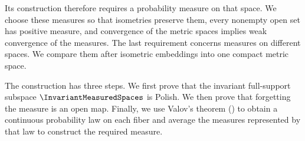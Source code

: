 Its construction therefore requires a probability measure on that space.
We choose these measures so that isometries preserve them,
every nonempty open set has positive measure,
and convergence of the metric spaces implies weak convergence of the measures.
The last requirement concerns measures on different spaces.
We compare them after isometric embeddings into one compact metric space.

The construction has three steps.
We first prove that the invariant full-support subspace
$\InvariantMeasuredSpaces$
is Polish.
We then prove that forgetting the measure is an open map.
Finally,
we use Valov's theorem () to obtain a continuous probability law on each fiber
and average the measures represented by that law to construct the required measure.
